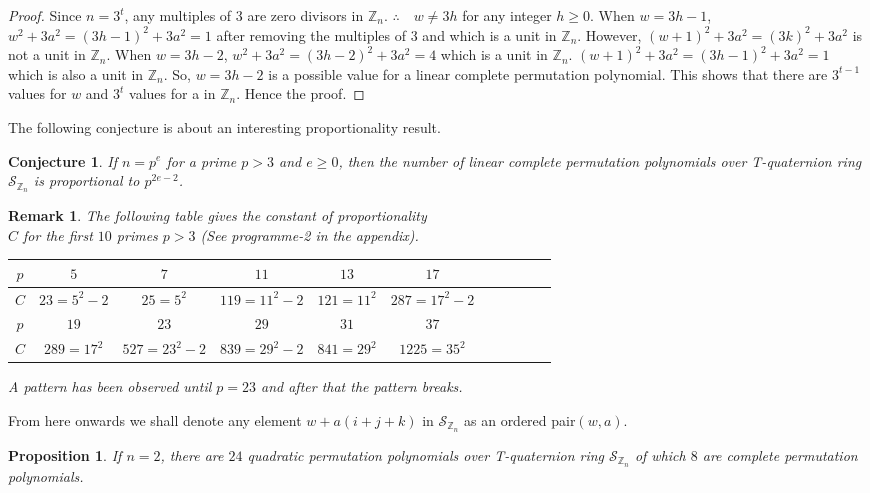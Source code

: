 \documentclass[sn-mathphys,Numbered]{sn-jnl}%
\theoremstyle{thmstyleone}
\newtheorem{proposition}[theorem]{Proposition}
\theoremstyle{thmstyletwo}
\newtheorem{remark}{Remark}
\theoremstyle{thmstylethree}
\newtheorem{conjecture}[theorem]{Conjecture}
\begin{document}
\begin{proof}
Since $n=3^{t}$, any multiples of 3 are zero divisors in $\mathbb{Z}_{n}$. $\therefore \quad w\neq 3h$ for any integer $h\geq 0$. When $w=3h-1$, $w^{2}+3a^{2}=(3h-1)^{2}+3a^{2}=1$ after removing the multiples of 3 and which is a unit in $\mathbb{Z}_{n}$. However, $(w+1)^{2}+3a^{2}=(3k)^{2}+3a^{2}$ is not a unit in $\mathbb{Z}_{n}$. When $w=3h-2$, $w^{2}+3a^{2}=(3h-2)^{2}+3a^{2}=4$ which is a unit in $\mathbb{Z}_{n}$. $(w+1)^{2}+3a^{2}=(3h-1)^{2}+3a^{2}=1$ which is also a unit in $\mathbb{Z}_{n}$. So, $w=3h-2$ is a possible value for a linear complete permutation polynomial. This shows that there are $3^{t-1}$ values for $w$ and $3^{t}$ values for a in $\mathbb{Z}_{n}$. Hence the proof. 
\end{proof}
\noindent
The following conjecture is about an interesting proportionality result.
\begin{conjecture}
If $n=p^{e}$ for a prime $p>3$ and $e\geq0$,  then the number of  linear complete permutation polynomials over T-quaternion ring $\mathcal{S}_{\mathbb{Z}_{n}}$ is proportional to $p^{2e-2}$.
\end{conjecture}
\begin{remark}
The following table gives the constant of proportionality \\ $C$ for the first $10$ primes $p>3$ (See programme-2 in the appendix).
\begin{tabular}{|c|c|c|c|c|c|c|c|c|c|c|}
  \hline
  $p$ & $5$ & $7$& $11$ & $13$ & $17$ \\
  \hline
  $C$ & $23=5^{2}-2$ &$25=5^{2}$ & $119=11^{2}-2$ & $121=11^{2}$ & $287=17^{2}-2$ \\
  \hline
  $p$ & $19$ & $23$ & $29$ & $31$ & $37$ \\
  \hline
   $C$ &$289= 17^{2}$ & $527= 23^{2}-2$& $839=29^{2}-2$ & $841=29^{2}$ & $1225=35^{2}$\\
   \hline
  
\end{tabular}

\noindent
A pattern has been observed until $ p=23$ and after that the pattern breaks. 
\end{remark}
\noindent
From here onwards we shall denote any element  $w+a(i+j+k)$ in $\mathcal{S}_{\mathbb{Z}_{n}}$ as an ordered pair$(w,a)$. 
\begin{proposition} \label{rd26}
If $n=2$, there are $24$ quadratic permutation polynomials over T-quaternion ring $\mathcal{S}_{\mathbb{Z}_{n}}$ of which $8$ are complete permutation polynomials. 
\end{proposition}
\end{document}
